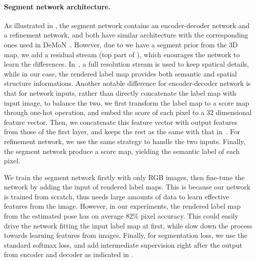\paragraph{Segment network architecture.} As illustrated in , the segment network contains an encoder-decoder network and a refinement network, and both have similar architecture with the corresponding ones used in DeMoN~\cite{ummenhofer2016demon}. However, due to we have a segment prior from the 3D map, we add a residual stream (top part of ), which enourages the network to learn the differences. In~\cite{pohlen2016full}, a full resolution stream is used to keep spatical details, while in our case, the rendered label map provides both semantic and spatial structure informations.
Another notable difference for encoder-decoder network is that for network inputs, rather than directly concatenate the label map with input image, to balance the two, we first transform the label map to a score map through one-hot operation, and embed the score of each pixel to a 32 dimensional feature vector. Then, we concatenate this feature vector with output features from those of the first layer, and keeps the rest as the same with that in~\cite{ummenhofer2016demon}. For refinement network, we use the same strategy to handle the two inputs. Finally, the segment network produce a score map, yielding the semantic label of each pixel.

We train the segment network firstly with only RGB images, then fine-tune the network by adding the input of rendered label maps. This is because our network is trained from scratch, thus needs large amounts of data to learn effective features from the image. However, in our experiments, the rendered label map from the estimated pose has on average 82$\%$ pixel accuracy. This could easily drive the network fitting the input label map at first, while slow down the process towards learning features from images. Finally, for segmentation loss, we use the standard softmax loss, and add intermediate supervision right after the output from encoder and decoder as indicated in . 